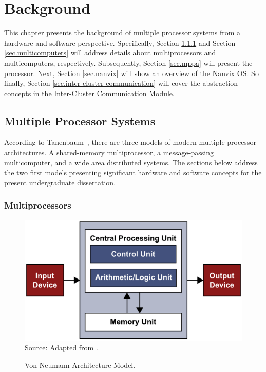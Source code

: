 \chapter{Background}
\label{ch.fundamentation}

	This chapter presents the background of multiple processor
	systems from a hardware and software perspective.
	Specifically, Section \ref{sec.multiprocessors} and Section \ref{sec.multicomputers}
	will address details about multiprocessors and multicomputers, respectively.
	Subsequently, Section \ref{sec.mppa} will present the \mppa processor.
	Next, Section \ref{sec.nanvix} will show an overview of the Nanvix OS.
	So finally, Section \ref{sec.inter-cluster-communication} will cover the abstraction
	concepts in the Inter-Cluster Communication Module.


\section{Multiple Processor Systems}
\label{sec.multiple-processor-systems}

	According to Tanenbaum~\cite{tanenbaum:4ed}, there are three models of
	modern multiple processor architectures.
	A shared-memory multiprocessor, a message-passing multicomputer, and a wide
	area distributed systems.
	The sections below address the two first models presenting significant
	hardware and software concepts for the present undergraduate dissertation.

	\subsection{Multiprocessors}
	\label{sec.multiprocessors}

		\begin{figure}[t]
			\centering
			\caption{Von Neumann Architecture Model.}
			\includegraphics[width=.8\textwidth]{images/neumann.pdf}
			\\ \vspace{0.3cm}
			Source: Adapted from \cite{tanenbaum:4ed}.

			\label{fig.neumann}
		\end{figure}

